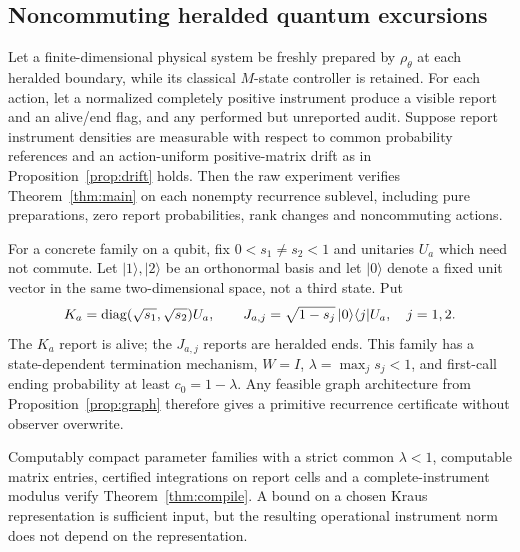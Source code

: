 \subsection{Noncommuting heralded quantum excursions}
\begin{theorem}\label{thm:quantum}
Let a finite-dimensional physical system be freshly prepared by $\rho_\theta$ at each heralded boundary, while its classical $M$-state controller is retained. For each action, let a normalized completely positive instrument produce a visible report and an alive/end flag, and any performed but unreported audit. Suppose report instrument densities are measurable with respect to common probability references and an action-uniform positive-matrix drift as in Proposition~\ref{prop:drift} holds. Then the raw experiment verifies Theorem~\ref{thm:main} on each nonempty recurrence sublevel, including pure preparations, zero report probabilities, rank changes and noncommuting actions.

For a concrete family on a qubit, fix $0<s_1\ne s_2<1$ and unitaries $U_a$ which need not commute. Let $|1\rangle,|2\rangle$ be an orthonormal basis and let $|0\rangle$ denote a fixed unit vector in the same two-dimensional space, not a third state. Put
\begin{equation}\label{eq:kraus}
 K_a=\operatorname{diag}(\sqrt{s_1},\sqrt{s_2})U_a,
 \qquad J_{a,j}=\sqrt{1-s_j}\,|0\rangle\langle j|U_a,
 \quad j=1,2.
\end{equation}
The $K_a$ report is alive; the $J_{a,j}$ reports are heralded ends. This family has a state-dependent termination mechanism, $W=I$, $\lambda=\max_j s_j<1$, and first-call ending probability at least $c_0=1-\lambda$. Any feasible graph architecture from Proposition~\ref{prop:graph} therefore gives a primitive recurrence certificate without observer overwrite.

Computably compact parameter families with a strict common $\lambda<1$, computable matrix entries, certified integrations on report cells and a complete-instrument modulus verify Theorem~\ref{thm:compile}. A bound on a chosen Kraus representation is sufficient input, but the resulting operational instrument norm does not depend on the representation.
\end{theorem}
